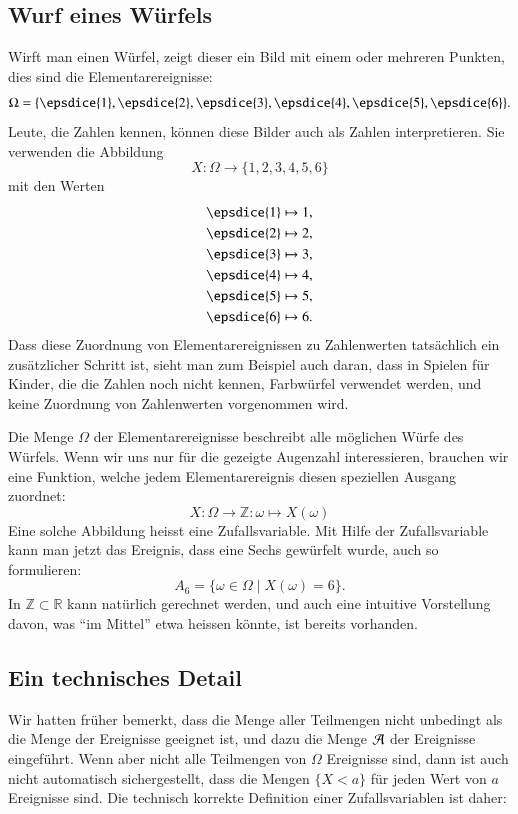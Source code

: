 \subsection{Wurf eines Würfels}
Wirft man einen Würfel, zeigt dieser ein Bild mit einem oder mehreren Punkten, 
dies sind die Elementarereignisse:
\[
\Omega = \{
\epsdice{1},
\epsdice{2},
\epsdice{3},
\epsdice{4},
\epsdice{5},
\epsdice{6}
\}.
\]
Leute, die Zahlen kennen, können diese Bilder auch als Zahlen interpretieren.
Sie verwenden die Abbildung
\[
X\colon \Omega \to \{1,2,3,4,5,6\}
\]
mit den Werten
\begin{align*}
\epsdice{1}&\mapsto 1,\\
\epsdice{2}&\mapsto 2,\\
\epsdice{3}&\mapsto 3,\\
\epsdice{4}&\mapsto 4,\\
\epsdice{5}&\mapsto 5,\\
\epsdice{6}&\mapsto 6.
\end{align*}
Dass diese Zuordnung von Elementarereignissen zu Zahlenwerten tatsächlich
ein zusätzlicher Schritt ist, sieht man zum Beispiel auch daran, dass
in Spielen für Kinder, die die Zahlen noch nicht kennen, Farbwürfel
verwendet werden, und keine Zuordnung von Zahlenwerten vorgenommen wird.

Die Menge $\Omega$ der Elementarereignisse beschreibt alle möglichen Würfe
des Würfels.
Wenn wir uns nur für die gezeigte Augenzahl interessieren,
brauchen wir eine Funktion, welche jedem Elementarereignis diesen speziellen
Ausgang zuordnet:
\[
X: \Omega\to{\mathbb Z}: \omega\mapsto X(\omega)
\]
Eine solche Abbildung heisst eine Zufallsvariable.
Mit Hilfe der Zufallsvariable kann man jetzt das Ereignis, dass eine Sechs
gewürfelt wurde, auch so formulieren:
\[
A_6=\{\omega\in\Omega\;|\;X(\omega) = 6\}.
\]
In $\mathbb{Z}\subset\mathbb{R}$ kann natürlich gerechnet werden, und
auch eine intuitive Vorstellung davon, was ``im Mittel'' etwa heissen
könnte, ist bereits vorhanden.

\subsection{Ein technisches Detail}
Wir hatten früher bemerkt, dass die Menge aller Teilmengen nicht unbedingt
als die Menge der Ereignisse geeignet ist, und dazu die Menge
$\cal A$ der Ereignisse eingeführt.
Wenn aber nicht alle Teilmengen von $\Omega$ Ereignisse sind,
dann ist auch nicht automatisch sichergestellt, dass die
Mengen $\{X < a\}$ für jeden Wert von $a$  Ereignisse sind.
Die technisch korrekte Definition einer Zufallsvariablen ist daher:

